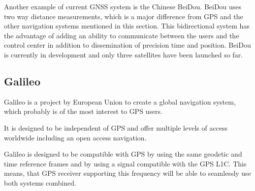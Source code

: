 Another example of current GNSS system is the Chinese BeiDou.
BeiDou uses two way distance measurements, which is a major difference from GPS and the other navigation
systems mentioned in this section.
This bidirectional system has the advantage of adding an ability to communicate between the
users and the control center in addition to dissemination of precision time and position.
BeiDou is currently in development and only three satellites have been launched so far.


\subsection{Galileo}
\label{sec:galileo}

Galileo \cite{galileo} is a project by European Union to create a global navigation system, which
probably is of the most interest to GPS users.

It is designed to be independent of GPS and offer multiple levels of access worldwide
including an open access navigation.

Galileo is designed to be compatible with GPS by using the same geodetic and time reference frames
and by using a signal compatible with the GPS L1C.
This means, that GPS receiver supporting this frequency will be able to seamlessly
use both systems combined.
